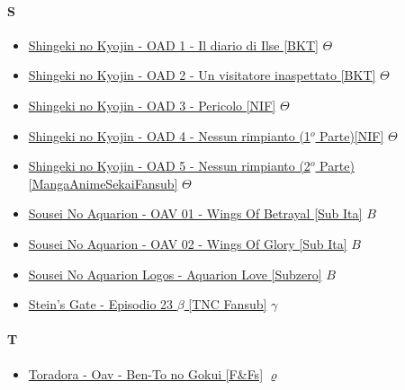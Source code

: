 		\paragraph{S} \hypertarget{OS}{}
			\begin{itemize}
				\item \href{https://mega.nz/#!9WZhhbTA!tLQwRC3Cs6Vnog_ILTsqfyg83w6EJNBZ_CSiclwL_VQ} {Shingeki no Kyojin - OAD 1 - Il diario di Ilse [BKT]} $\varTheta$  \\ 
				\item \href{https://mega.nz/#!NORH3BxB!6uR6jXCQZZl4iUfvHkzMw2wDZVTsEhTiwNtQjVWIL08} {Shingeki no Kyojin - OAD 2 - Un visitatore inaspettato [BKT]} $\varTheta$  \\ 
				\item \href{https://mega.nz/#!kCpXXJLS!euFPo38qoVfKBU3IvqG12o-K-Vh1EhKBrmlDjaXj2yE} {Shingeki no Kyojin - OAD 3 - Pericolo [NIF]} $\varTheta$  \\ 
				\item \href{https://mega.nz/#!gCQjjKZB!LIPcWV7LJ5Ycu9I5luiNSAXv-YQolI3HUXWdANh8StM} {Shingeki no Kyojin - OAD 4 - Nessun rimpianto (1$ ^{o} $ Parte)[NIF]} $\varTheta$  \\ 
				\item \href{https://mega.nz/#!peJXETBB!MavVPF7A9jU6D2NM5W6osbyi4SMniySBwEkblgPqGqw} {Shingeki no Kyojin - OAD 5 - Nessun rimpianto (2$ ^{o} $ Parte)[MangaAnimeSekaiFansub]} $\varTheta$  \\ 
				\item \href{https://mega.nz/#!MVtDwDba!PzGWOcR9oz_BBWsPSccuM7bhYab9qnR34I6x3iXVEgg} {Sousei No Aquarion - OAV 01 - Wings Of Betrayal [Sub Ita]} $B$  \\  
				\item \href{https://mega.nz/#!oItV2LBT!OAhKJfldZRQMLzH53YzcZXVlc6d7Q-kIct7u-QC8VDI} {Sousei No Aquarion - OAV 02 - Wings Of Glory [Sub Ita]} $B$  \\  
				\item \href{https://mega.nz/#!pBU1TAAD!282znyU3U4E8VPSyTnRuB8_g8Zn9sVORiMINOLagT6g} {Sousei No Aquarion Logos - Aquarion Love [Subzero]} $B$  \\  
				\item \href{https://mega.nz/#!Q1JiUSTa!gvcba3yl3TQXsZlx38SfqO_SHYqWDcRCpjoOsoTfknw} {Stein's Gate - Episodio 23 $\beta$ [TNC Fansub]} $\gamma$  \\  
				
			\end{itemize}	
		
		\paragraph{T} \hypertarget{OT}{}
			\begin{itemize}
				\item \href{https://mega.nz/#!BeZT0ZpB!VlbzN-Tq63aHyI9Yo65c8xUl1rNDwg19m1rZymUqXEg} {Toradora - Oav - Ben-To no Gokui [F\&Fs]} $\varrho$  \\  
				
				
			\end{itemize}